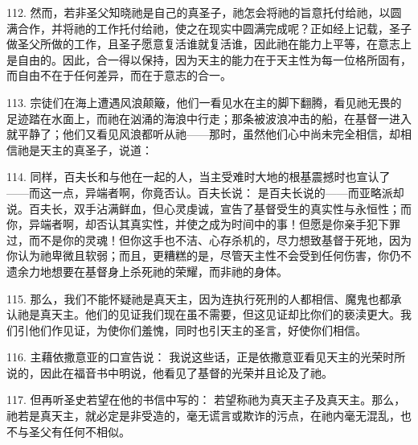 112. 然而，若非圣父知晓祂是自己的真圣子，祂怎会将祂的旨意托付给祂，以圆满合作，并将祂的工作托付给祂，使之在现实中圆满完成呢？正如经上记载，圣子做圣父所做的工作，且圣子愿意复活谁就复活谁，因此祂在能力上平等，在意志上是自由的。因此，合一得以保持，因为天主的能力在于天主性为每一位格所固有，而自由不在于任何差异，而在于意志的合一。\par

113. 宗徒们在海上遭遇风浪颠簸，他们一看见水在主的脚下翻腾，看见祂无畏的足迹踏在水面上，而祂在汹涌的海浪中行走；那条被波浪冲击的船，在基督一进入就平静了；他们又看见风浪都听从祂——那时，虽然他们心中尚未完全相信，却相信祂是天主的真圣子，说道：\par

114. 同样，百夫长和与他在一起的人，当主受难时大地的根基震撼时也宣认了——而这一点，异端者啊，你竟否认。百夫长说： 是百夫长说的——而亚略派却说。百夫长，双手沾满鲜血，但心灵虔诚，宣告了基督受生的真实性与永恒性；而你，异端者啊，却否认其真实性，并使之成为时间中的事！但愿是你亲手犯下罪过，而不是你的灵魂！但你这手也不洁、心存杀机的，尽力想致基督于死地，因为你认为祂卑微且软弱；而且，更糟糕的是，尽管天主性不会受到任何伤害，你仍不遗余力地想要在基督身上杀死祂的荣耀，而非祂的身体。\par

115. 那么，我们不能怀疑祂是真天主，因为连执行死刑的人都相信、魔鬼也都承认祂是真天主。他们的见证我们现在虽不需要，但这见证却比你们的亵渎更大。我们引他们作见证，为使你们羞愧，同时也引天主的圣言，好使你们相信。\par

116. 主藉依撒意亚的口宣告说： 我说这些话，正是依撒意亚看见天主的光荣时所说的，因此在福音书中明说，他看见了基督的光荣并且论及了祂。\par

117. 但再听圣史若望在他的书信中写的： 若望称祂为真天主子及真天主。那么，祂若是真天主，就必定是非受造的，毫无谎言或欺诈的污点，在祂内毫无混乱，也不与圣父有任何不相似。\par

\par

